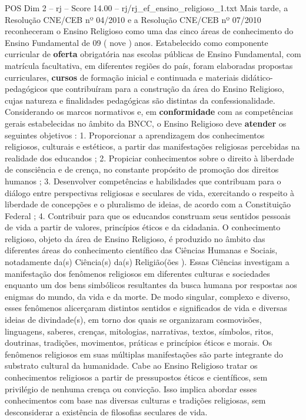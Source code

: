 \begin{textsample}{POS Dim 2 – rj – Score 14.00 – rj/rj\_ef\_ensino\_religioso\_1.txt}
Mais tarde, a Resolução CNE/CEB nº 04/2010 e a Resolução CNE/CEB nº 07/2010 reconheceram o Ensino Religioso como uma das cinco áreas de conhecimento do Ensino Fundamental de 09 ( nove ) anos.
Estabelecido como componente curricular de \textbf{oferta} obrigatória nas escolas públicas de Ensino Fundamental, com matrícula facultativa, em diferentes regiões do país, foram elaboradas propostas curriculares, \textbf{cursos} de formação inicial e continuada e materiais didático-pedagógicos que contribuíram para a construção da área do Ensino Religioso, cujas natureza e finalidades pedagógicas são distintas da confessionalidade.
Considerando os marcos normativos e, em \textbf{conformidade} com as competências gerais estabelecidas no âmbito da BNCC, o Ensino Religioso deve \textbf{atender} os seguintes objetivos : 1.
Proporcionar a aprendizagem dos conhecimentos religiosos, culturais e estéticos, a partir das manifestações religiosas percebidas na realidade dos educandos ; 2.
Propiciar conhecimentos sobre o direito à liberdade de consciência e de crença, no constante propósito de promoção dos direitos humanos ; 3.
Desenvolver competências e habilidades que contribuam para o diálogo entre perspectivas religiosas e seculares de vida, exercitando o respeito à liberdade de concepções e o pluralismo de ideias, de acordo com a Constituição Federal ; 4.
Contribuir para que os educandos construam seus sentidos pessoais de vida a partir de valores, princípios éticos e da cidadania.
O conhecimento religioso, objeto da área de Ensino Religioso, é produzido no âmbito das diferentes áreas do conhecimento científico das Ciências Humanas e Sociais, notadamente da(s) Ciência(s) da(s) Religião(ões ).
Essas Ciências investigam a manifestação dos fenômenos religiosos em diferentes culturas e sociedades enquanto um dos bens simbólicos resultantes da busca humana por respostas aos enigmas do mundo, da vida e da morte.
De modo singular, complexo e diverso, esses fenômenos alicerçaram distintos sentidos e significados de vida e diversas ideias de divindade(s), em torno dos quais se organizaram cosmovisões, linguagens, saberes, crenças, mitologias, narrativas, textos, símbolos, ritos, doutrinas, tradições, movimentos, práticas e princípios éticos e morais.
Os fenômenos religiosos em suas múltiplas manifestações são parte integrante do substrato cultural da humanidade.
Cabe ao Ensino Religioso tratar os conhecimentos religiosos a partir de pressupostos éticos e científicos, sem privilégio de nenhuma crença ou convicção.
Isso implica abordar esses conhecimentos com base nas diversas culturas e tradições religiosas, sem desconsiderar a existência de filosofias seculares de vida.

\end{textsample}
